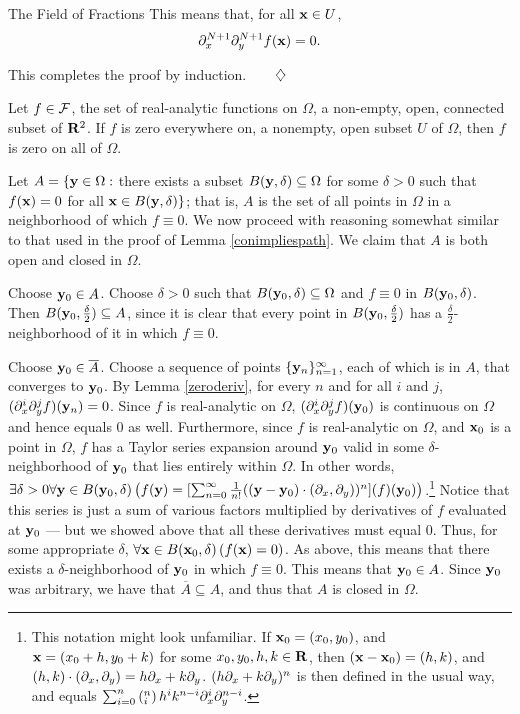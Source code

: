 \begin{section}{The Field of Fractions}
\indent This means that, for all $\mathbf{x} \in U$,
\[
\partial_{x}^{N+1} \partial_{y}^{N+1} f(\mathbf{x}) = 0.
\]

\indent This completes the proof by induction.$\qquad \diamondsuit$

\begin{lemma}
\label{fequalszero}
Let $f \in \mathcal{F}$, the set of real-analytic functions on $\Omega$, a non-empty, open, connected subset of $\mathbf{R}^2$.  If $f$ is zero everywhere on, a nonempty, open subset $U$ of $\Omega$, then $f$ is zero on all of $\Omega$.
\end{lemma}

\proof
Let $A = \{ \mathbf{y} \in \Omega :$ there exists a subset $B(\mathbf{y}, \delta) \subseteq \Omega$ for some $\delta > 0$ such that $f( \mathbf{x} ) = 0$ for all $\mathbf{x} \in B(\mathbf{y} ,\delta ) \}$; that is, $A$ is the set of all points in $\Omega$ in a neighborhood of which $f \equiv 0$.  We now proceed with reasoning somewhat similar to that used in the proof of Lemma \ref{conimpliespath}.  We claim that $A$ is both open and closed in $\Omega$.

  Choose $\mathbf{y}_0 \in A$.  Choose $\delta > 0$ such that $B(\mathbf{y}_0,\delta) \subseteq \Omega$ and $f \equiv 0$ in $B(\mathbf{y}_0,\delta)$.  Then $B(\mathbf{y}_0,\frac{\delta}{2}) \subseteq A$, since it is clear that every point in $B(\mathbf{y}_0,\frac{\delta}{2})$ has a $\frac{\delta}{2}$-neighborhood of it in which $f \equiv 0$.

  Choose $\mathbf{y}_0 \in \overline{A}$.  Choose a sequence of points $\{ \mathbf{y}_n \}_{n=1}^\infty$, each of which is in $A$, that converges to $\mathbf{y}_0$.  By Lemma \ref{zeroderiv}, for every $n$ and for all $i$ and $j$, $(\partial_{x}^i \partial_{y}^j f)(\mathbf{y}_n) = 0$.  Since $f$ is real-analytic on $\Omega$, $(\partial_{x}^i \partial_{y}^j f)(\mathbf{y}_0)$ is continuous on $\Omega$ and hence equals $0$ as well.  Furthermore, since $f$ is real-analytic on $\Omega$, and $\mathbf{x}_0$ is a point in $\Omega$, $f$ has a Taylor series expansion around $\mathbf{y}_0$ valid in some $\delta$-neighborhood of $\mathbf{y}_0$ that lies entirely within $\Omega$.  In other words, $\exists\delta > 0\forall\mathbf{y} \in B(\mathbf{y}_0,\delta)\left( f(\mathbf{y}) = [\sum_{n=0}^\infty\frac{1}{n!}((\mathbf{y}-\mathbf{y}_0)\cdot(\partial_{x}, \partial_{y}))^n](f)(\mathbf{y}_0)\right)$.\footnote{This notation might look unfamiliar.  If $\mathbf{x}_0 = (x_0, y_0)$, and $\mathbf{x} = (x_0 + h, y_0 + k)$ for some $x_0, y_0, h, k \in \mathbf{R}$, then $(\mathbf{x} - \mathbf{x}_0) = (h,k)$, and $(h, k) \cdot (\partial_{x}, \partial_{y}) = h \partial_{x} + k \partial_{y}$.  $(h \partial_{x} + k \partial_{y})^n$ is then defined in the usual way, and equals $\sum_{i=0}^n \left( {}_i^n \right) h^i k^{n-i} \partial_{x}^i \partial_{y}^{n-i}$.}  Notice that this series is just a sum of various factors multiplied by derivatives of $f$ evaluated at $\mathbf{y}_0$ --- but we showed above that all these derivatives must equal 0.  Thus, for some appropriate $\delta$, $\forall\mathbf{x} \in B(\mathbf{x}_0,\delta)\left( f(\mathbf{x}) = 0 \right)$.  As above, this means that there exists a $\delta$-neighborhood of $\mathbf{y}_0$ in which $f \equiv 0$.  This means that $\mathbf{y}_0 \in A$.  Since $\mathbf{y}_0$ was arbitrary, we have that $\overline{A} \subseteq A$, and thus that $A$ is closed in $\Omega$.


\end{section}
